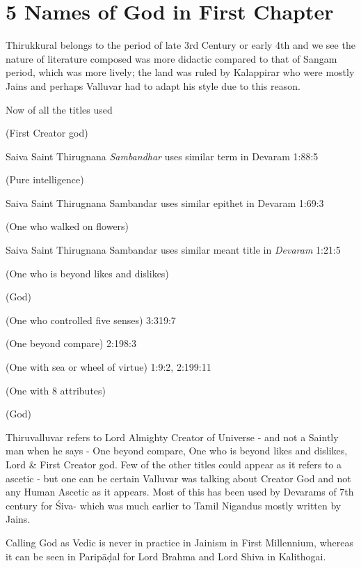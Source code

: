 \section*{5 Names of God in First Chapter}

Thirukkural belongs to the period of late 3rd Century or early 4th and we see the nature of literature composed was more didactic compared to that of Sangam period, which was more lively; the land was ruled by Kalappirar who were mostly Jains and perhaps Valluvar had to adapt his style due to this reason.

Now of all the titles used

 (First Creator god)

Saiva Saint Thirugnana \textit{Sambandhar} uses similar term in Devaram 1:88:5

 (Pure intelligence)

Saiva Saint Thirugnana Sambandar uses similar epithet in Devaram 1:69:3

 (One who walked on flowers)

Saiva Saint Thirugnana Sambandar uses similar meant title in \textit{Devaram} 1:21:5

 (One who is beyond likes and dislikes)

 (God)

 (One who controlled five senses) 3:319:7

 (One beyond compare) 2:198:3

 (One with sea or wheel of virtue) 1:9:2, 2:199:11

 (One with 8 attributes)

 (God)

Thiruvalluvar refers to Lord Almighty Creator of Universe - and not a Saintly man when he says - One beyond compare, One who is beyond likes and dislikes, Lord \& First Creator god. Few of the other titles could appear as it refers to a ascetic - but one can be certain Valluvar was talking about Creator God and not any Human Ascetic as it appears. Most of this has been used by Devarams of 7th century for Śiva- which was much earlier to Tamil Nigandus mostly written by Jains.

Calling God as Vedic is never in practice in Jainism in First Millennium, whereas it can be seen in Paripāḍal for Lord Brahma and Lord Shiva in Kalithogai.


